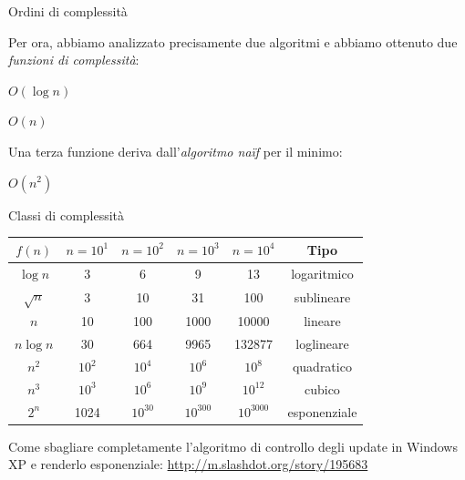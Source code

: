\begin{frame}{Ordini di complessità}
	
Per ora, abbiamo analizzato precisamente due algoritmi e abbiamo ottenuto due \emph{funzioni di complessità}:
\BI
\item {}   \alert{$O(\log n)$}
\item {}    \alert{$O(n)$}
\EI

\medskip
Una terza funzione deriva dall'\emph{algoritmo naïf} per il minimo:
\BI
\item {}  \alert{$O(n^2)$}
\EI

	
\end{frame}

\begin{frame}{Classi di complessità}


\begin{center}
\begin{tabular}{|c|c|c|c|c|c|}
\hline
$f(n)$ & $n=10^1$ & $n=10^2$ & $n=10^3$ & $n=10^4$ & \textbf{Tipo} \\
\hline
$\log n$ & 3 & 6 & 9 & 13 & logaritmico \\
\hline
$\sqrt{n}$ & 3 & 10 & 31 & 100 & sublineare \\
\hline
$n$ & 10 & 100 & 1000 & 10000 & lineare \\
\hline
$n \log n$ & 30 & 664 & 9965 & 132877 & loglineare \\
\hline
$n^2$ & $10^2$ & $10^4$ & $10^6$ & $10^8$& quadratico \\
\hline
$n^3$ & $10^3$ & $10^6$ & $10^9$ & $10^{12}$ & cubico \\
\hline
$2^n$ & 1024 & $10^{30}$ & $10^{300}$ & $10^{3000}$ & esponenziale \\
\hline
\end{tabular}
\end{center}

\bigskip
Come sbagliare completamente l'algoritmo di controllo degli update in
Windows XP e renderlo esponenziale:
\url{http://m.slashdot.org/story/195683}


\end{frame}


